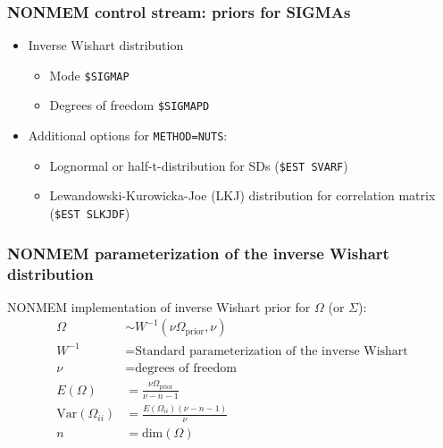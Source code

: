 \documentclass{beamer}
\begin{document}
\begin{frame}[fragile]
  \frametitle{NONMEM control stream: priors for SIGMAs}

\begin{itemize}
  \item<1-> Inverse Wishart distribution
  \begin{itemize}
    \item Mode \verb|$SIGMAP|
    \item Degrees of freedom \verb|$SIGMAPD|
  \end{itemize}
  \item<2-> Additional options for \verb|METHOD=NUTS|:
        \begin{itemize}
          \item Lognormal or half-t-distribution for SDs (\verb|$EST SVARF|)
          \item Lewandowski-Kurowicka-Joe (LKJ) distribution for correlation matrix (\verb|$EST SLKJDF|)
        \end{itemize}
\end{itemize}

\end{frame}

\begin{frame}
  \frametitle{NONMEM parameterization of the inverse Wishart distribution}
  
NONMEM implementation of inverse Wishart prior for $\Omega$ (or
    $\Sigma$):
    \begin{align*}
      \Omega &\sim W^{-1}\left(\nu\Omega_\text{prior}, \nu\right) \\
W^{-1} &= \text{Standard parameterization of the inverse Wishart} \\
\nu &= \text{degrees of freedom} \\
E\left(\Omega\right) &= \frac{\nu\Omega_\text{prior}}{\nu - n - 1} \\
\text{Var}\left(\Omega_{ii}\right) &= \frac{E\left(\Omega_{ii}\right)  \left(\nu - n -
                          1\right)}{\nu} \\
n &= \text{dim}\left(\Omega\right)
    \end{align*}

\end{frame}
\end{document}
